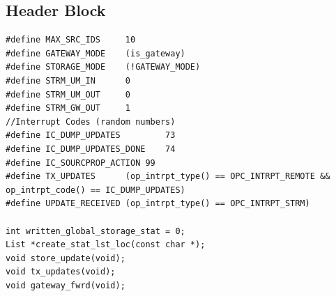 \subsection{Header Block}
{\tiny
\begin{verbatim}
#define MAX_SRC_IDS		10
#define GATEWAY_MODE	(is_gateway)
#define STORAGE_MODE	(!GATEWAY_MODE)
#define STRM_UM_IN		0
#define STRM_UM_OUT		0
#define STRM_GW_OUT		1
//Interrupt Codes (random numbers)
#define IC_DUMP_UPDATES 		73
#define IC_DUMP_UPDATES_DONE 	74
#define IC_SOURCPROP_ACTION 99
#define TX_UPDATES 		(op_intrpt_type() == OPC_INTRPT_REMOTE && op_intrpt_code() == IC_DUMP_UPDATES)
#define UPDATE_RECEIVED	(op_intrpt_type() == OPC_INTRPT_STRM)

int written_global_storage_stat = 0;
List *create_stat_lst_loc(const char *);
void store_update(void);
void tx_updates(void);
void gateway_fwrd(void);
\end{verbatim}
}

